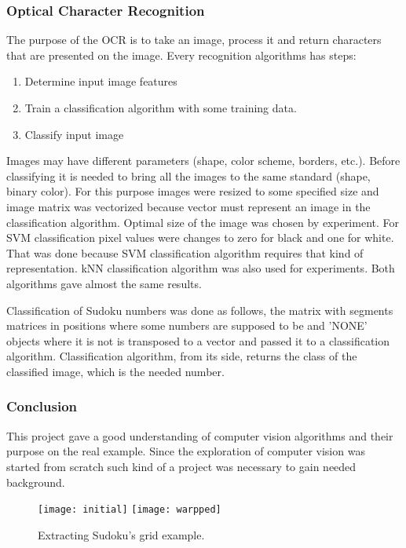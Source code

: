 \documentclass[../../main]{subfiles}
\begin{document}
\subsubsection{Optical Character Recognition}

The purpose of the OCR is to take an image, process it and return characters that are presented on the image.
Every recognition algorithms has steps:
\begin{enumerate}
\item  Determine input image features
\item  Train a classification algorithm with some training data.
\item  Classify input image
\end{enumerate}

Images may have different parameters (shape, color scheme, borders, etc.). Before classifying it is needed to bring all the images to the same standard (shape, binary color). For this purpose images were resized to some specified size and image matrix was vectorized because vector must represent an image in the classification algorithm. Optimal size of the image was chosen by experiment. For \ac{SVM} classification pixel values were changes to zero for black and one for white. That was done because \ac{SVM} classification algorithm requires that kind of representation. \ac{kNN} classification algorithm was also used for experiments.
Both algorithms gave almost the same results.

Classification of Sudoku numbers was done as follows, the matrix with segments matrices in positions where some numbers are supposed to be and 'NONE' objects where it is not is transposed to a vector and passed it to a classification algorithm. Classification algorithm, from its side, returns the class of the classified image, which is the needed number.

\subsubsection{Conclusion}

This project gave a good understanding of computer vision algorithms and their purpose on the real example. Since the exploration of computer vision was started from scratch such kind of a project was necessary to gain needed background. 

\begin{figure} [ht!]
    \begin{center}
        \texttt{[image: initial]}
        \texttt{[image: warpped]}
        \caption{Extracting Sudoku's grid example.}
        \label{fig:sudoku_extraction}
    \end{center}
\end{figure}
\end{document}
